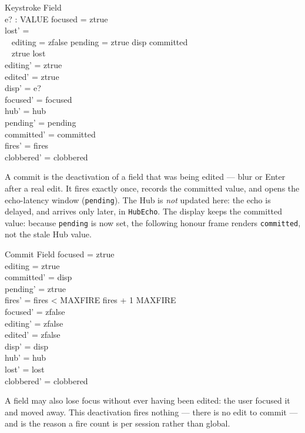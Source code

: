 \documentclass[a4paper,10pt,fleqn]{article}
\begin{document}
\begin{schema}{Keystroke}
  \Delta Field \\
  e? : VALUE
\where
  focused = ztrue \\
  lost' = \\
  \quad~ \IF editing = zfalse \land pending = ztrue \land disp \neq committed \\
  \quad~ \THEN ztrue \ELSE lost \\
  editing' = ztrue \\
  edited' = ztrue \\
  disp' = e? \\
  focused' = focused \\
  hub' = hub \\
  pending' = pending \\
  committed' = committed \\
  fires' = fires \\
  clobbered' = clobbered
\end{schema}

A commit is the deactivation of a field that was being edited --- blur or Enter
after a real edit.  It fires exactly once, records the committed value, and
opens the echo-latency window (\texttt{pending}).  The Hub is \emph{not} updated
here: the echo is delayed, and arrives only later, in \texttt{HubEcho}.  The
display keeps the committed value: because \texttt{pending} is now set, the
following honour frame renders \texttt{committed}, not the stale Hub value.

\begin{schema}{Commit}
  \Delta Field
\where
  focused = ztrue \\
  editing = ztrue \\
  committed' = disp \\
  pending' = ztrue \\
  fires' = \IF fires < MAXFIRE \THEN fires + 1 \ELSE MAXFIRE \\
  focused' = zfalse \\
  editing' = zfalse \\
  edited' = zfalse \\
  disp' = disp \\
  hub' = hub \\
  lost' = lost \\
  clobbered' = clobbered
\end{schema}

A field may also lose focus without ever having been edited: the user focused it
and moved away.  This deactivation fires nothing --- there is no edit to commit
--- and is the reason a fire count is per session rather than global.
\end{document}
